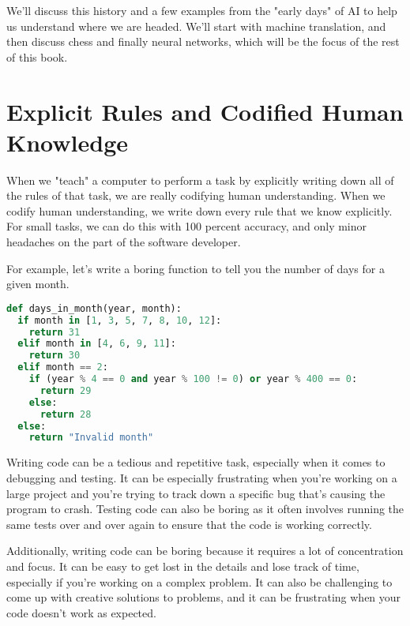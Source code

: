 We’ll discuss this history and a few examples from the "early days" of AI to help us understand where we are headed. We’ll start with machine translation, and then discuss chess and finally neural networks, which will be the focus of the rest of this book.

\section{Explicit Rules and Codified Human Knowledge}

When we "teach" a computer to perform a task by explicitly writing down all of the rules of that task, we are really codifying human understanding. When we codify human understanding, we write down every rule that we know explicitly. For small tasks, we can do this with 100 percent accuracy, and only minor headaches on the part of the software developer.

For example, let's write a boring function to tell you the number of days for a given month. 

\begin{lstlisting}[language=Python,style=kaolstplain,linewidth=1.5\textwidth]
def days_in_month(year, month):
  if month in [1, 3, 5, 7, 8, 10, 12]:
    return 31
  elif month in [4, 6, 9, 11]:
    return 30
  elif month == 2:
    if (year % 4 == 0 and year % 100 != 0) or year % 400 == 0:
      return 29
    else:
      return 28
  else:
    return "Invalid month"

\end{lstlisting}


Writing code can be a tedious and repetitive task, especially when it comes to debugging and testing. It can be especially frustrating when you’re working on a large project and you’re trying to track down a specific bug that’s causing the program to crash. Testing code can also be boring as it often involves running the same tests over and over again to ensure that the code is working correctly.

Additionally, writing code can be boring because it requires a lot of concentration and focus. It can be easy to get lost in the details and lose track of time, especially if you’re working on a complex problem. It can also be challenging to come up with creative solutions to problems, and it can be frustrating when your code doesn’t work as expected.

